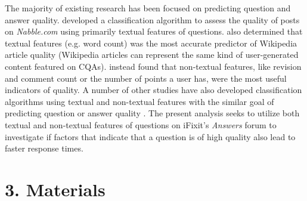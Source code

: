 \documentclass{article}
\begin{document}
The majority of existing research has been focused on predicting question and answer quality. \cite{Weimer2007} developed a classification algorithm to assess the quality of posts on \textit{Nabble.com} using primarily textual features of questions. \cite{Blumenstock} also determined that textual features (e.g. word count) was the most accurate predictor of Wikipedia article quality (Wikipedia articles can represent the same kind of user-generated content featured on CQAs). \cite{H.fu} instead found that non-textual features, like revision and comment count or the number of points a user has, were the most useful indicators of quality. A number of other studies have also developed classification algorithms using textual and non-textual features with the similar goal of predicting question or answer quality \cite{Yao2015} \cite{Toba2014} \cite{Ponzanelli2014a} \cite{Ravi2014}. The present analysis seeks to utilize both textual and non-textual features of questions on iFixit's \textit{Answers} forum to investigate if factors that indicate that a question is of high quality also lead to faster response times.


\section*{3. Materials}
\end{document}
